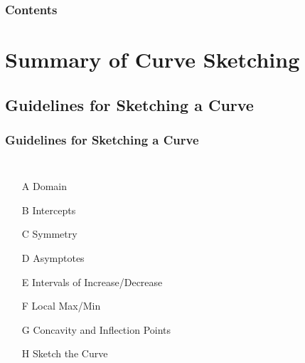 \documentclass[serif,ignorenonframetext]{beamer}
\title{\commonTitleZeroThreeFive}
\subtitle{\commonSubtitleZeroThreeFive}
\author{\commonAuthor}
\institute{\commonInstitute}
\date{\commonDateZeroThreeFive}
\begin{document}

\begin{frame}
  \titlepage
\end{frame}

\begin{frame}
  \frametitle{Contents}
  \tableofcontents
\end{frame}

\section{Summary of Curve Sketching}

\subsection{Guidelines for Sketching a Curve}

\begin{frame}
  \frametitle{Guidelines for Sketching a Curve}
  \begin{columns}
  \begin{itemize}[<+->]
  \item[A] Domain
  \item[B] Intercepts
  \item[C] Symmetry
  \item[D] Asymptotes
  \item[E] Intervals of Increase/Decrease
  \item[F] Local Max/Min
  \item[G] Concavity and Inflection Points
  \item[H] Sketch the Curve
  \end{itemize}
  \begin{tikzpicture}
  \end{tikzpicture}
  \end{columns}
\end{frame}
\end{document}
